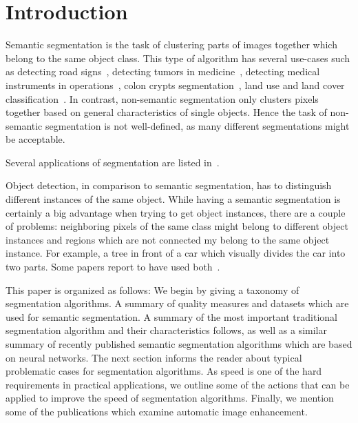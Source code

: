 \section{Introduction}\label{sec:introduction}
Semantic segmentation is the task of clustering parts of images together which
belong to the same object class. This type of algorithm has several use-cases
such as detecting road %
signs~\cite{4220659}, detecting tumors in medicine~\cite{moon2002automatic},
detecting medical instruments in operations~\cite{wei1997automatic}, colon
crypts segmentation~\cite{cohen2015memory}, land use and land cover
classification~\cite{huang2002assessment}. In contrast, non-semantic
segmentation only clusters pixels together based on general characteristics of
single objects. Hence the task of non-semantic segmentation is not
well-defined, as many different segmentations might be acceptable.

Several applications of segmentation are listed
in~\cite{annurev.bioeng.2.1.315}.

Object detection, in comparison to semantic segmentation, has to distinguish
different instances of the same object. While having a semantic segmentation is
certainly a big advantage when trying to get object instances, there are a
couple of problems: neighboring pixels of the same class might belong to
different object instances and regions which are not connected my belong to the
same object instance. For example, a tree in front of a car which visually
divides the car into two parts. Some papers report to have used
both~\cite{tighe2014scene}.



This paper is organized as follows: We begin by giving a taxonomy of
segmentation algorithms. %
A summary of quality measures and datasets which are used for semantic
segmentation. A summary of the most important traditional segmentation
algorithm and their characteristics follows, as well as a similar summary of
recently published semantic segmentation algorithms which are based on neural
networks. The next section informs the reader about typical problematic cases
for segmentation algorithms. As speed is one of the hard requirements in
practical applications, we outline some of the actions that can be applied to
improve the speed of segmentation algorithms. Finally, we mention some of the
publications which examine automatic image enhancement.
